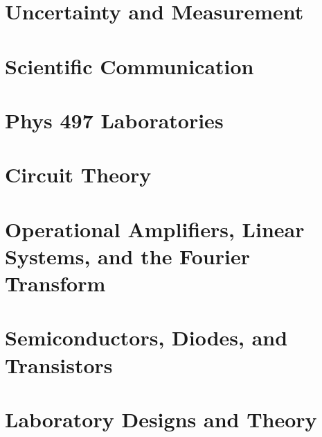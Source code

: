 \documentclass[12pt, a4paper, oneside, openright, titlepage]{book}
\begin{document}
\tableofcontents

\part{Uncertainty and Measurement}



\part{Scientific Communication}



\part{Phys 497 Laboratories}



\part{Circuit Theory}






\part{Operational Amplifiers, Linear Systems, and the Fourier Transform}






\part{Semiconductors, Diodes, and Transistors}



\part{Laboratory Designs and Theory}

\end{document}
